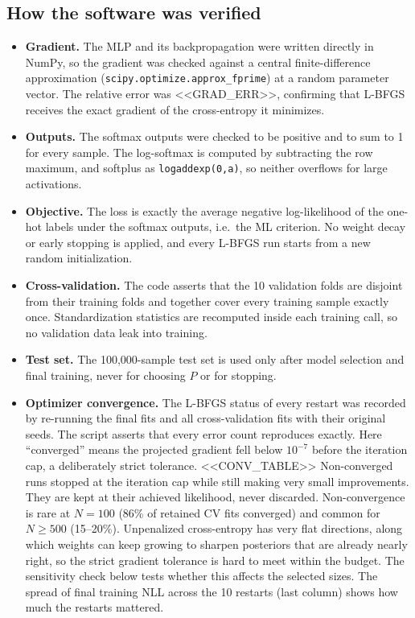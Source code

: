 \documentclass[11pt]{article}
\begin{document}
\subsection*{How the software was verified}
\begin{itemize}
\item \textbf{Gradient.} The MLP and its backpropagation were written directly in NumPy, so the gradient was checked against a central finite-difference approximation (\texttt{scipy.optimize.approx\_fprime}) at a random parameter vector. The relative error was <<GRAD_ERR>>, confirming that L-BFGS receives the exact gradient of the cross-entropy it minimizes.
\item \textbf{Outputs.} The softmax outputs were checked to be positive and to sum to 1 for every sample. The log-softmax is computed by subtracting the row maximum, and softplus as \texttt{logaddexp(0,a)}, so neither overflows for large activations.
\item \textbf{Objective.} The loss is exactly the average negative log-likelihood of the one-hot labels under the softmax outputs, i.e.\ the ML criterion. No weight decay or early stopping is applied, and every L-BFGS run starts from a new random initialization.
\item \textbf{Cross-validation.} The code asserts that the 10 validation folds are disjoint from their training folds and together cover every training sample exactly once. Standardization statistics are recomputed inside each training call, so no validation data leak into training.
\item \textbf{Test set.} The 100{,}000-sample test set is used only after model selection and final training, never for choosing $P$ or for stopping.
\item \textbf{Optimizer convergence.} The L-BFGS status of every restart was recorded by re-running the final fits and all cross-validation fits with their original seeds. The script asserts that every error count reproduces exactly. Here ``converged'' means the projected gradient fell below $10^{-7}$ before the iteration cap, a deliberately strict tolerance.
<<CONV_TABLE>>
Non-converged runs stopped at the iteration cap while still making very small improvements. They are kept at their achieved likelihood, never discarded. Non-convergence is rare at $N=100$ (86\% of retained CV fits converged) and common for $N\ge500$ (15--20\%). Unpenalized cross-entropy has very flat directions, along which weights can keep growing to sharpen posteriors that are already nearly right, so the strict gradient tolerance is hard to meet within the budget. The sensitivity check below tests whether this affects the selected sizes. The spread of final training NLL across the 10 restarts (last column) shows how much the restarts mattered.


\end{itemize}
\end{document}
